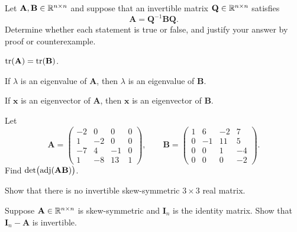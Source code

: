 \documentclass[11pt,oneside]{article}
\begin{document}
\begin{problem}
Let $\mathbf A,\mathbf B\in\mathbb{R}^{n\times n}$ and suppose that an invertible matrix $\mathbf Q\in\mathbb{R}^{n\times n}$ satisfies
\[
\mathbf A=\mathbf Q^{-1}\mathbf B\mathbf Q.
\]
Determine whether each statement is true or false, and justify your answer by proof or counterexample.
\begin{problemchoices}
\item $\operatorname{tr}(\mathbf A)=\operatorname{tr}(\mathbf B)$.
\item If $\lambda$ is an eigenvalue of $\mathbf A$, then $\lambda$ is an eigenvalue of $\mathbf B$.
\item If $\mathbf x$ is an eigenvector of $\mathbf A$, then $\mathbf x$ is an eigenvector of $\mathbf B$.
\end{problemchoices}
\end{problem}

\begin{problem}
Let
\[
\mathbf A=
\begin{pmatrix}
-2&0&0&0\\
1&-2&0&0\\
-7&4&-1&0\\
1&-8&13&1
\end{pmatrix},
\qquad
\mathbf B=
\begin{pmatrix}
1&6&-2&7\\
0&-1&11&5\\
0&0&1&-4\\
0&0&0&-2
\end{pmatrix}.
\]
Find $\det\bigl(\operatorname{adj}(\mathbf A\mathbf B)\bigr)$.
\end{problem}

\begin{problem}
\begin{problemsubparts}
\item Show that there is no invertible skew-symmetric $3\times3$ real matrix.
\item Suppose $\mathbf A\in\mathbb{R}^{n\times n}$ is skew-symmetric and $\mathbf I_n$ is the identity matrix. Show that $\mathbf I_n-\mathbf A$ is invertible.
\end{problemsubparts}
\end{problem}
\end{document}
